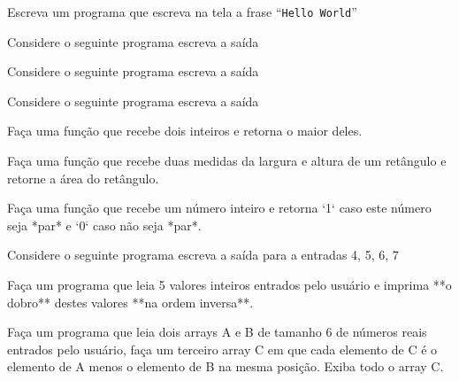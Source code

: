 \documentclass[12pt]{exam}
\def\code#1{\texttt{#1}}
\begin{document}
\begin{questions}











\question[1] Escreva um programa que escreva na tela a frase ``\code{Hello World}''


\break







\question[1] Considere o seguinte programa escreva a saída




\question[1] Considere o seguinte programa escreva a saída




\question[1] Considere o seguinte programa escreva a saída



\question[1] Faça uma função que recebe dois inteiros e retorna o maior deles.

\question[1] Faça uma função que recebe duas medidas da largura e altura de um retângulo e retorne a área do retângulo.

\question[1] Faça uma função que recebe um número inteiro e retorna `1` caso este número seja *par* e `0` caso não seja *par*.

\question[1] Considere o seguinte programa escreva a saída para a entradas 4, 5, 6, 7


\question[1] Faça um programa que leia 5 valores inteiros entrados pelo usuário e imprima **o dobro** destes valores **na ordem inversa**.

\question[1] Faça um programa que leia dois arrays A e B de tamanho 6 de números reais entrados pelo usuário, faça um terceiro array C em que cada elemento de C é o elemento de A menos o elemento de B na mesma posição. Exiba todo o array C.


\end{questions}
\end{document}
